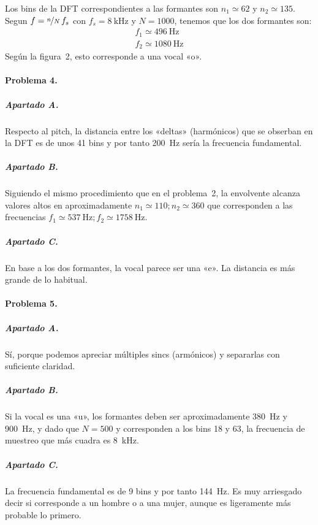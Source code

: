Los bins de la DFT correspondientes a las formantes son $n_1 \simeq 62$ y
$n_2 \simeq 135$. Segun $f = \nicefrac{n}{N} \, f_s$ con $f_s =
\SI{8}{\kilo\hertz}$ y $N = \num{1000}$, tenemos que los dos formantes son:
%
\begin{align*}
  f_1 \simeq \SI{496}{\hertz}
\\
  f_2 \simeq \SI{1080}{\hertz}
\end{align*}
%
Según la figura~2, esto corresponde a una vocal «o».

\finishpage


\startpage
\paragraph{Problema 4.}

\subparagraph{Apartado A.}

Respecto al pitch, la distancia entre los «deltas» (harmónicos) que se obserban
en la DFT es de unos \num{41} bins y por tanto \SI{200}{\hertz} sería la
frecuencia fundamental.

\subparagraph{Apartado B.}

Siguiendo el mismo procedimiento que en el problema~2, la envolvente alcanza
valores altos en aproximadamente $n_1 \simeq \num{110}; n_2 \simeq \num{360}$
que corresponden a las frecuencias $f_1 \simeq \SI{537}{\hertz}; f_2 \simeq
\SI{1758}{\hertz}$.

\subparagraph{Apartado C.}

En base a los dos formantes, la vocal parece ser una «e». La distancia es más
grande de lo habitual.

\finishpage


\startpage
\paragraph{Problema 5.}

\subparagraph{Apartado A.}

Sí, porque podemos apreciar múltiples sincs (armónicos) y separarlas con
suficiente claridad.

\subparagraph{Apartado B.}

Si la vocal es una «u», los formantes deben ser aproximadamente \SI{380}{\hertz}
y \SI{900}{\hertz}, y dado que $N = 500$ y corresponden a los bins \num{18} y
\num{63}, la frecuencia de muestreo que más cuadra es \SI{8}{\kilo\hertz}.

\subparagraph{Apartado C.}

La frecuencia fundamental es de 9 bins y por tanto \SI{144}{\hertz}.
Es muy arriesgado decir si corresponde a un hombre o a una mujer, aunque
es ligeramente más probable lo primero.

